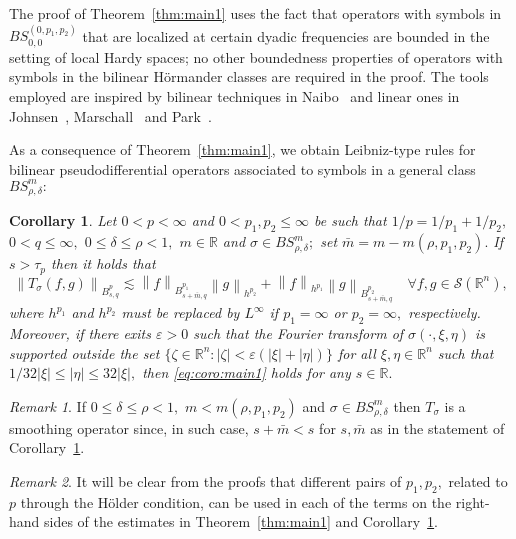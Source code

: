 \documentclass[final,letterpaper,12pt,oneside]{class_diss}
\newtheorem{corollary}[theorem]{Corollary}
\theoremstyle{remark}
\newtheorem{remark}{Remark}[section]
\newcommand{\re}{\mathbb{R}}
\newcommand{\rn}{{{\mathbb R}^n}}
\newcommand{\sw}{{\mathcal{S}}(\rn)}
\newcommand{\ibes}[3]{B_{#1,#3}^{#2}} %
\newcommand{\abs}[1]{\left\vert #1 \right\vert}
\newcommand{\norm}[2]{\left\|#1\right\|_{#2}}
\newcommand{\hcline}{1/p=1/p_1+1/p_2}
\begin{document}
The proof of Theorem~\ref{thm:main1} uses the fact that operators with symbols in $BS^{(0,p_1,p_2)}_{0,0}$ that are localized at certain dyadic frequencies are bounded in the setting of local Hardy spaces; no other boundedness properties of operators with symbols in the bilinear H\"ormander classes are required in the proof. The tools employed are inspired by bilinear techniques in Naibo~\cite{MR3393696} and linear ones in   Johnsen~\cite{MR2163627}, Marschall~\cite{MR1376592} and   Park~\cite{Park}.

As a consequence of Theorem~\ref{thm:main1}, we obtain  Leibniz-type rules for bilinear pseudodifferential operators associated to symbols in a general class $BS^m_{\rho,\delta}:$

\begin{corollary}\label{coro:main1} 
Let $0<p<\infty$ and $0<p_1,p_2\le \infty$ be such that $\hcline,$ $0<q\le \infty,$  $0\le\delta \le \rho<1,$   $m\in \re$ and $\sigma\in BS^{m}_{\rho,\delta};$ set $\bar{m}=m-m(\rho,p_1,p_2).$  If  $s>\tau_p$ then it holds that
\begin{equation}\label{eq:coro:main1}
\norm{T_\sigma(f,g)}{\ibes{s}{p}{q}}\lesssim \norm{f}{\ibes{s+\bar{m}}{p_1}{q}}\norm{g}{h^{p_2}} +\norm{f}{h^{p_1}}\norm{g}{\ibes{s+\bar{m}}{p_2}{q}}\quad \forall f,g\in \sw,
\end{equation}
where $h^{p_1}$ and $h^{p_2}$ must be replaced by $L^\infty$ if $p_1=\infty$ or $p_2=\infty,$ respectively. Moreover,  if there exits $\varepsilon>0$ such that the Fourier transform of  $\sigma(\cdot,\xi,\eta)$ is  supported outside the set  $\{\zeta\in\rn:\abs{\zeta}<\varepsilon (\abs{\xi}+\abs{\eta})\}$ for all  $\xi,\eta\in\rn$ such that $1/32\abs{\xi}\le \abs{\eta}\le 32 \abs{\xi},$ then \eqref{eq:coro:main1} holds for any $s\in\re.$
\end{corollary}

\begin{remark} If $0\le \delta\le \rho<1,$ $m<m(\rho,p_1,p_2)$ and $\sigma\in BS^m_{\rho,\delta}$ then $T_\sigma$ is a smoothing operator since, in such case, $s+\bar{m}<s$ for $s,\bar{m}$ as in the statement of Corollary~\ref{coro:main1}. 
\end{remark}

\begin{remark} It will be clear from the proofs that different pairs of $p_1,p_2,$ related to $p$ through the H\"older condition, can be used in each of the terms on the right-hand sides of the estimates in Theorem~\ref{thm:main1} and Corollary~\ref{coro:main1}. 
\end{remark}
\end{document}
